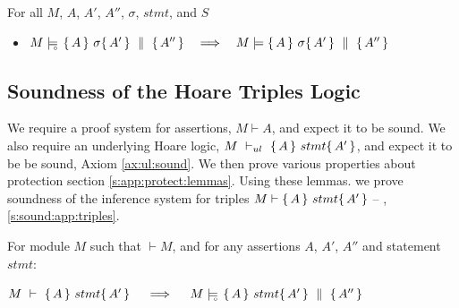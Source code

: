 \begin{lemma}
For all $M$, $A$, $A'$, $A''$, $\sigma$, $stmt$, and $S$
\begin{itemize}
\item
 $M \models\!\!\!\!_{_{\circ}}\   \{\, A \, \}\ \sigma \{\, A' \, \} \, \,\parallel\,\, \{\, A'' \, \}    \ \ \ \Longrightarrow \ \ \   M \models  \{\, A \, \}\ \sigma \{\, A' \, \} \, \,\parallel\,\, \{\, A'' \, \} $

\end{itemize}
\end{lemma}






\subsection{Soundness of the Hoare Triples Logic}

We require a  proof system for assertions, $M\vdash A$, and expect it to be sound.
We also require
an   underlying Hoare logic, $M\ \vdash_{ul}\   \{\, A \, \}\ stmt \{\, A' \, \}$, and expect it to be be  sound, \cf Axiom \ref{ax:ul:sound}.
\label{sect:prove:triples:sound}
We then prove various properties about protection
\cf section \ref{s:app:protect:lemmas}.
Using these lemmas. we prove soundness of the inference system for triples $M \vdash   \{\, A \, \}\ stmt \{\, A' \, \} $ -- \cf \A, \ref{s:sound:app:triples}.

 

\begin{Theorem}
\label{l:triples:sound}
For module  $M$   such that  $\vdash M$, and for any assertions $A$,  $A'$, $A''$ and statement  $stmt$:
\begin{center}
$M\ \vdash\  \triple A {stmt} {A'}  \ \ \ \  \Longrightarrow  \ \ \ \ \satisfiesD {M} {\quadruple {A} {stmt} {A'} {A''}}$
\end{center}
\end{Theorem}
 

